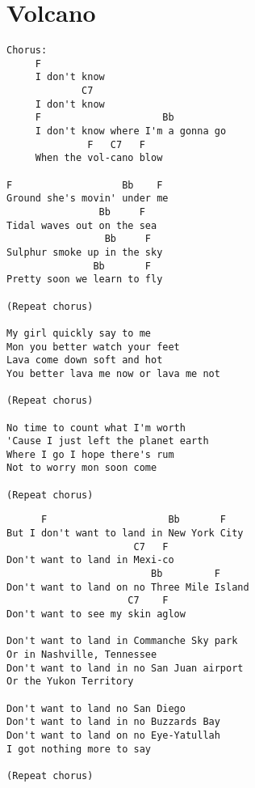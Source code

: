 \documentclass[leqno]{memoir}
\begin{document}
\chapter{Volcano}
\begin{verbatim}
Chorus:
     F
     I don't know
             C7
     I don't know
     F                     Bb
     I don't know where I'm a gonna go
              F   C7   F
     When the vol-cano blow

F                   Bb    F
Ground she's movin' under me
                Bb     F
Tidal waves out on the sea
                 Bb     F
Sulphur smoke up in the sky
               Bb       F
Pretty soon we learn to fly

(Repeat chorus)

My girl quickly say to me
Mon you better watch your feet
Lava come down soft and hot
You better lava me now or lava me not

(Repeat chorus)

No time to count what I'm worth
'Cause I just left the planet earth
Where I go I hope there's rum
Not to worry mon soon come

(Repeat chorus)
\end{verbatim}
\newpage
\begin{verbatim}
      F                     Bb       F
But I don't want to land in New York City
                      C7   F
Don't want to land in Mexi-co
                         Bb         F
Don't want to land on no Three Mile Island
                     C7    F
Don't want to see my skin aglow

Don't want to land in Commanche Sky park
Or in Nashville, Tennessee
Don't want to land in no San Juan airport
Or the Yukon Territory

Don't want to land no San Diego
Don't want to land in no Buzzards Bay
Don't want to land on no Eye-Yatullah
I got nothing more to say

(Repeat chorus)
\end{verbatim}
\newpage
\end{document}
